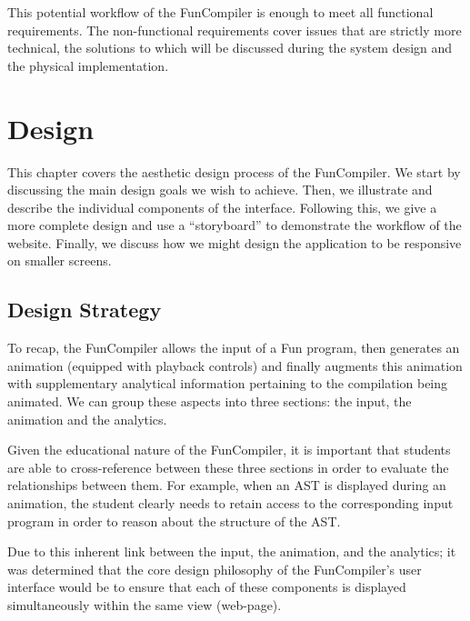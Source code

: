 \documentclass{l4proj}
\begin{document}
This potential workflow of the FunCompiler is enough to meet all functional requirements. The non-functional requirements cover issues that are strictly more technical, the solutions to which will be discussed during the system design and the physical implementation.

\chapter{Design}
This chapter covers the aesthetic design process of the FunCompiler. We start by discussing the main design goals we wish to achieve. Then, we illustrate and describe the individual components of the interface. Following this, we give a more complete design and use a ``storyboard'' to demonstrate the workflow of the website. Finally, we discuss how we might design the application to be responsive on smaller screens.

\section{Design Strategy}
To recap, the FunCompiler allows the input of a Fun program, then generates an animation (equipped with playback controls) and finally augments this animation with supplementary analytical information pertaining to the compilation being animated. We can group these aspects into three sections: the input, the animation and the analytics. 

Given the educational nature of the FunCompiler, it is important that students are able to cross-reference between these three sections in order to evaluate the relationships between them. For example, when an AST is displayed during an animation, the student clearly needs to retain access to the corresponding input program in order to reason about the structure of the AST. 

Due to this inherent link between the input, the animation, and the analytics; it was determined that the core design philosophy of the FunCompiler's user interface would be to ensure that each of these components is displayed simultaneously within the same view (web-page).

\end{document}
